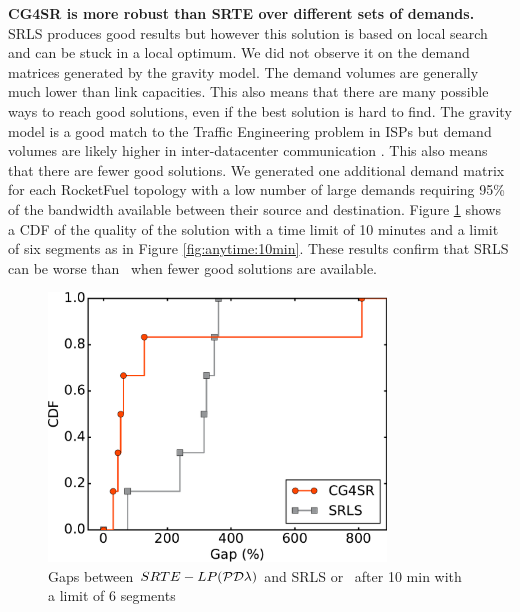 \textbf{CG4SR is more robust than SRTE over different sets of demands.}
SRLS produces good results but however this solution is based on local search and can be stuck in a local optimum.
We did not observe it on the demand matrices generated by the gravity model.
The demand volumes are generally much lower than link capacities.
This also means that there are many possible ways to reach good solutions,
even if the best solution is hard to find.
The gravity model is a good match to the Traffic Engineering problem in ISPs
but demand volumes are likely higher in inter-datacenter communication \cite{b4}.
This also means that there are fewer good solutions.
We generated one additional demand matrix for each RocketFuel topology
with a low number of large demands requiring 95\% of the bandwidth available
between their source and destination.
Figure \ref{fig:anytime:srlsdefense} shows a CDF of the quality of the solution with
a time limit of 10 minutes and a limit of six segments as in Figure \ref{fig:anytime:10min}.
These results confirm that SRLS can be worse than \name~when fewer good solutions are available.

\begin{figure}
	\centering
	\includegraphics[width=0.8\textwidth]{images/solver_gap_optim_600-6.2016RocketFuelUCL_datacenter.cdfs.pdf}
	\caption{Gaps between $SRTE-LP(\P,\D,\lambda)$ and SRLS or \name~after 10 min with a limit of 6 segments}
	\label{fig:anytime:srlsdefense}
\end{figure}

